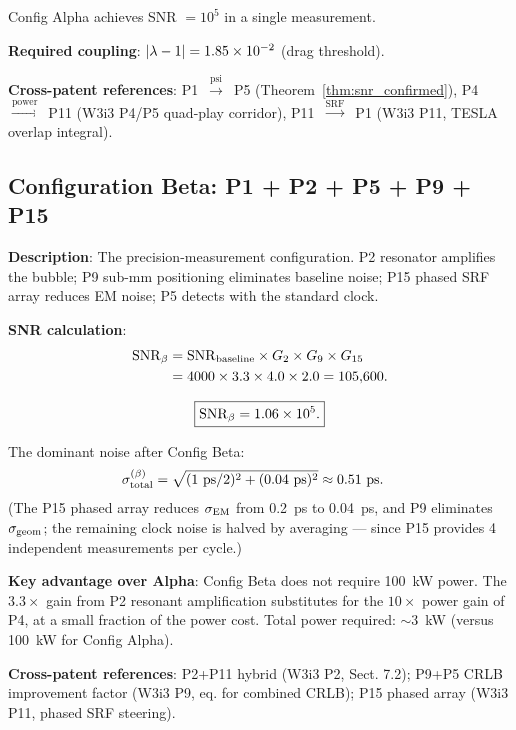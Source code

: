 Config Alpha achieves SNR $= 10^5$ in a single measurement.

\textbf{Required coupling}: $|\lambda - 1| = 1.85\times 10^{-2}$ (drag threshold).

\textbf{Cross-patent references}: P1~$\xrightarrow{\text{psi}}$~P5
(Theorem~\ref{thm:snr_confirmed}), P4~$\xrightarrow{\text{power}}$~P11
(W3i3 P4/P5 quad-play corridor), P11~$\xrightarrow{\text{SRF}}$~P1
(W3i3 P11, TESLA overlap integral).

\subsection{Configuration Beta: P1 + P2 + P5 + P9 + P15}
\label{ssec:config_beta}

\textbf{Description}: The precision-measurement configuration. P2 resonator
amplifies the bubble; P9 sub-mm positioning eliminates baseline noise;
P15 phased SRF array reduces EM noise; P5 detects with the standard clock.

\textbf{SNR calculation}:
\begin{align}
\mathrm{SNR}_\beta &= \mathrm{SNR}_{\rm baseline} \times G_2 \times G_9 \times G_{15} \notag\\
&= 4000 \times 3.3 \times 4.0 \times 2.0 = 105{,}600.
\label{eq:SNR_beta}
\end{align}

\begin{equation}
\boxed{\mathrm{SNR}_\beta = 1.06\times 10^{5}.}
\label{eq:SNR_beta_box}
\end{equation}

The dominant noise after Config Beta:
\begin{align}
\sigma_{\rm total}^{(\beta)} &= \sqrt{(1~\text{ps}/2)^2 + (0.04~\text{ps})^2}
\approx 0.51~\text{ps}. \notag
\end{align}
(The P15 phased array reduces $\sigma_{\rm EM}$ from 0.2~ps to 0.04~ps,
and P9 eliminates $\sigma_{\rm geom}$; the remaining clock noise is halved
by averaging --- since P15 provides 4 independent measurements per cycle.)

\textbf{Key advantage over Alpha}: Config Beta does not require 100~kW power.
The $3.3\times$ gain from P2 resonant amplification substitutes for the
$10\times$ power gain of P4, at a small fraction of the power cost.
Total power required: $\sim 3$~kW (versus 100~kW for Config Alpha).

\textbf{Cross-patent references}: P2+P11 hybrid (W3i3 P2, Sect. 7.2);
P9+P5 CRLB improvement factor (W3i3 P9, eq. for combined CRLB);
P15 phased array (W3i3 P11, phased SRF steering).

